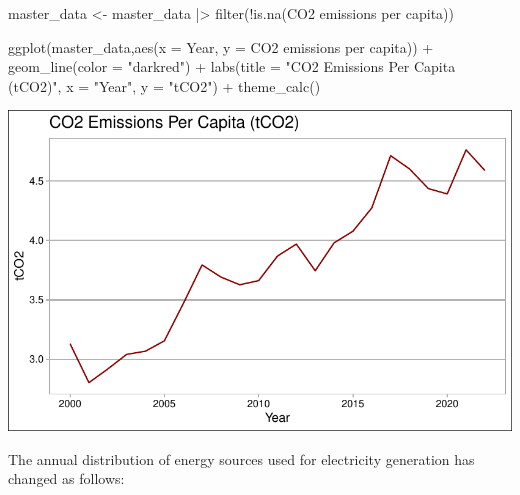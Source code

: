\documentclass[
  letterpaper,
  DIV=11,
  numbers=noendperiod]{scrartcl}
\newenvironment{Shaded}{\begin{snugshade}}{\end{snugshade}}
\newcommand{\AttributeTok}[1]{\textcolor[rgb]{0.40,0.45,0.13}{#1}}
\newcommand{\FunctionTok}[1]{\textcolor[rgb]{0.28,0.35,0.67}{#1}}
\newcommand{\NormalTok}[1]{\textcolor[rgb]{0.00,0.23,0.31}{#1}}
\newcommand{\OtherTok}[1]{\textcolor[rgb]{0.00,0.23,0.31}{#1}}
\newcommand{\SpecialCharTok}[1]{\textcolor[rgb]{0.37,0.37,0.37}{#1}}
\newcommand{\StringTok}[1]{\textcolor[rgb]{0.13,0.47,0.30}{#1}}
\begin{document}
\begin{Shaded}
\begin{Highlighting}[]
\NormalTok{master\_data }\OtherTok{\textless{}{-}}\NormalTok{ master\_data }\SpecialCharTok{|\textgreater{}} \FunctionTok{filter}\NormalTok{(}\SpecialCharTok{!}\FunctionTok{is.na}\NormalTok{(}\StringTok{\textasciigrave{}}\AttributeTok{CO2 emissions per capita}\StringTok{\textasciigrave{}}\NormalTok{))}

\FunctionTok{ggplot}\NormalTok{(master\_data,}\FunctionTok{aes}\NormalTok{(}\AttributeTok{x =}\NormalTok{ Year, }\AttributeTok{y =} \StringTok{\textasciigrave{}}\AttributeTok{CO2 emissions per capita}\StringTok{\textasciigrave{}}\NormalTok{)) }\SpecialCharTok{+}
  \FunctionTok{geom\_line}\NormalTok{(}\AttributeTok{color =} \StringTok{"darkred"}\NormalTok{) }\SpecialCharTok{+}
  \FunctionTok{labs}\NormalTok{(}\AttributeTok{title =} \StringTok{"CO2 Emissions Per Capita (tCO2)"}\NormalTok{, }\AttributeTok{x =} \StringTok{"Year"}\NormalTok{, }\AttributeTok{y =} \StringTok{"tCO2"}\NormalTok{) }\SpecialCharTok{+}
  \FunctionTok{theme\_calc}\NormalTok{()}
\end{Highlighting}
\end{Shaded}

\includegraphics{project_files/figure-pdf/unnamed-chunk-19-1.pdf}

The annual distribution of energy sources used for electricity
generation has changed as follows:
\end{document}
